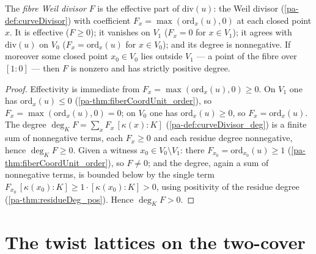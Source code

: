 \begin{definition}
  \label{pa-def:fiberWeilDivisor}
  \leanok

  The \emph{fibre Weil divisor} \(F\) is the effective part of \(\mathrm{div}(u)\): the Weil divisor
  (\ref{pa-def:curveDivisor}) with coefficient \(F_x = \max(\mathrm{ord}_x(u), 0)\) at each closed point
  \(x\). It is effective (\(F \ge 0\)); it vanishes on \(V_1\) (\(F_x = 0\) for \(x \in V_1\)); it
  agrees with \(\mathrm{div}(u)\) on \(V_0\) (\(F_x = \mathrm{ord}_x(u)\) for \(x \in V_0\)); and its
  degree is nonnegative. If moreover some closed point \(x_0 \in V_0\) lies outside \(V_1\) --- a
  point of the fibre over \([1 : 0]\) --- then \(F\) is nonzero and has strictly positive degree.
\end{definition}
\begin{proof}
  \leanok
  Effectivity is immediate from \(F_x = \max(\mathrm{ord}_x(u), 0) \ge 0\). On \(V_1\) one has
  \(\mathrm{ord}_x(u) \le 0\) (\ref{pa-thm:fiberCoordUnit_order}), so \(F_x = \max(\mathrm{ord}_x(u), 0)
  = 0\); on \(V_0\) one has \(\mathrm{ord}_x(u) \ge 0\), so \(F_x = \mathrm{ord}_x(u)\). The degree
  \(\deg_K F = \sum_x F_x\,[\kappa(x):K]\) (\ref{pa-def:curveDivisor_deg}) is a finite sum of
  nonnegative terms, each \(F_x \ge 0\) and each residue degree nonnegative, hence \(\deg_K F \ge 0\).
  Given a witness \(x_0 \in V_0 \setminus V_1\): there \(F_{x_0} = \mathrm{ord}_{x_0}(u) \ge 1\)
  (\ref{pa-thm:fiberCoordUnit_order}), so \(F \ne 0\); and the degree, again a sum of nonnegative terms,
  is bounded below by the single term \(F_{x_0}\,[\kappa(x_0):K] \ge 1\cdot[\kappa(x_0):K] > 0\),
  using positivity of the residue degree (\ref{pa-thm:residueDeg_pos}). Hence \(\deg_K F > 0\).
\end{proof}

\section{The twist lattices on the two-cover}

